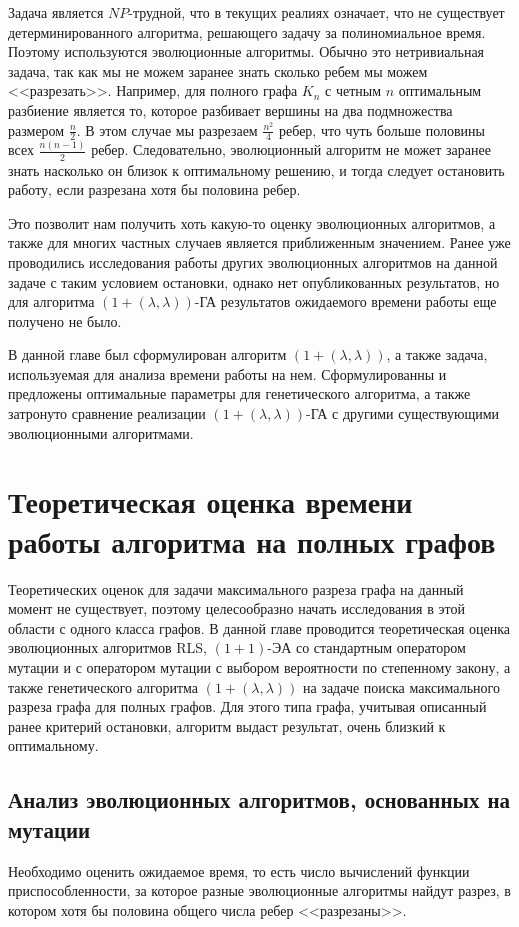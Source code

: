 \documentclass[times]{itmo-student-thesis}
\newcommand{\alglambda}{${(1 + (\lambda , \lambda))}$\xspace}
\newcommand{\alglambdaf}{${(1 + (\lambda , \lambda))}$-ГА\xspace}
\newcommand{\oea}{\mbox{$(1 + 1)$-ЭА}\xspace}
\begin{document}
Задача является $NP$-трудной, что в текущих реалиях означает, что не существует детерминированного алгоритма, решающего задачу за полиномиальное время. Поэтому используются эволюционные алгоритмы.
Обычно это нетривиальная задача, так как мы не можем заранее знать сколько ребем мы можем <<разрезать>>. Например, для полного графа $K_n$ с четным $n$ оптимальным разбиение является то, которое разбивает вершины на два подмножества размером $\frac{n}{2}$. В этом случае мы разрезаем $\frac{n^2}{4}$ ребер, что чуть больше половины всех $\frac{n(n-1)}{2}$ ребер. Следовательно, эволюционный алгоритм не может заранее знать насколько он близок к оптимальному решению, и тогда следует остановить работу, если разрезана хотя бы половина ребер.

Это позволит нам получить хоть какую-то оценку эволюционных алгоритмов, а также для многих частных случаев является приближенным значением. Ранее уже проводились исследования работы других эволюционных алгоритмов на данной задаче с таким условием остановки, однако нет опубликованных результатов, но для алгоритма \alglambdaf результатов ожидаемого времени работы еще получено не было.

\chapterconclusion
В данной главе был сформулирован алгоритм \alglambda, а также задача, используемая для анализа времени работы на нем. Сформулированны и предложены оптимальные параметры для генетического алгоритма, а также затронуто сравнение реализации \alglambdaf с другими существующими эволюционными алгоритмами.

\chapter{Теоретическая оценка времени работы алгоритма на полных графов}
Теоретических оценок для задачи максимального разреза графа на данный момент не существует, поэтому целесообразно начать исследования в этой области с одного класса графов.
В данной главе проводится теоретическая оценка эволюционных алгоритмов RLS, \oea со стандартным оператором мутации и с оператором мутации с выбором вероятности по степенному закону, а также генетического алгоритма \alglambda на задаче поиска максимального разреза графа для полных графов.
Для этого типа графа, учитывая описанный ранее критерий остановки, алгоритм выдаст результат, очень близкий к оптимальному.

\section{Анализ эволюционных алгоритмов, основанных на мутации}
Необходимо оценить ожидаемое время, то есть число вычислений функции приспособленности, за которое разные эволюционные алгоритмы найдут разрез, в котором хотя бы половина общего числа ребер <<разрезаны>>.
\end{document}
